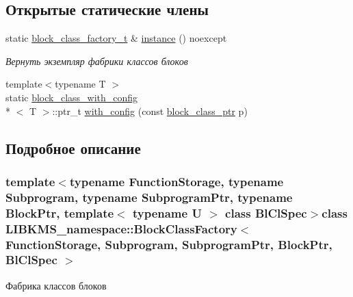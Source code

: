\subsection*{Открытые статические члены}
\begin{DoxyCompactItemize}
\item 
static \hyperlink{classLIBKMS__namespace_1_1BlockClassFactory_ac764a55036aeecf1279f5b43464ab9ad}{block\-\_\-class\-\_\-factory\-\_\-t} \& \hyperlink{classLIBKMS__namespace_1_1BlockClassFactory_a95ef3434b162301444650d201025bca6}{instance} () noexcept
\begin{DoxyCompactList}\small\item\em Вернуть экземпляр фабрики классов блоков \end{DoxyCompactList}\item 
{\footnotesize template$<$typename T $>$ }\\static \hyperlink{structLIBKMS__namespace_1_1BlockClassFactory_1_1block__class__with__config}{block\-\_\-class\-\_\-with\-\_\-config}\\*
$<$ T $>$\-::ptr\-\_\-t \hyperlink{classLIBKMS__namespace_1_1BlockClassFactory_afb4a03e20d36516a2b1ac6c3214bc1d8}{with\-\_\-config} (const \hyperlink{classLIBKMS__namespace_1_1BlockClassFactory_a882880cb8a33fcc808b41e283cea2dc3}{block\-\_\-class\-\_\-ptr} p)
\end{DoxyCompactItemize}


\subsection{Подробное описание}
\subsubsection*{template$<$typename Function\-Storage, typename Subprogram, typename Subprogram\-Ptr, typename Block\-Ptr, template$<$ typename U $>$ class Bl\-Cl\-Spec$>$class L\-I\-B\-K\-M\-S\-\_\-namespace\-::\-Block\-Class\-Factory$<$ Function\-Storage, Subprogram, Subprogram\-Ptr, Block\-Ptr, Bl\-Cl\-Spec $>$}

Фабрика классов блоков 


